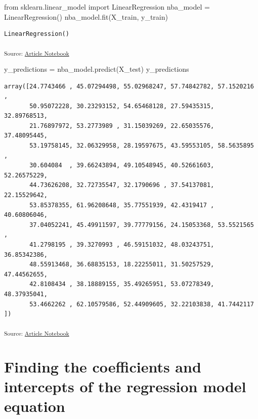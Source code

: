 \documentclass[
  a4paper,
  DIV=11,
  numbers=noendperiod]{scrreprt}
\newenvironment{Shaded}{\begin{snugshade}}{\end{snugshade}}
\newcommand{\ImportTok}[1]{\textcolor[rgb]{0.00,0.46,0.62}{#1}}
\newcommand{\NormalTok}[1]{\textcolor[rgb]{0.00,0.23,0.31}{#1}}
\newcommand{\OperatorTok}[1]{\textcolor[rgb]{0.37,0.37,0.37}{#1}}
\begin{document}
\begin{Shaded}
\begin{Highlighting}[]
\ImportTok{from}\NormalTok{ sklearn.linear\_model }\ImportTok{import}\NormalTok{ LinearRegression}
\NormalTok{nba\_model }\OperatorTok{=}\NormalTok{ LinearRegression()}
\NormalTok{nba\_model.fit(X\_train, y\_train)}
\end{Highlighting}
\end{Shaded}

\begin{verbatim}
LinearRegression()
\end{verbatim}

\textsubscript{Source:
\href{https://sigmadream.github.io/practice-quarto/NBA_2023-24.ipynb.html}{Article
Notebook}}

\begin{Shaded}
\begin{Highlighting}[]
\NormalTok{y\_predictions }\OperatorTok{=}\NormalTok{ nba\_model.predict(X\_test)}
\NormalTok{y\_predictions}
\end{Highlighting}
\end{Shaded}

\begin{verbatim}
array([24.7743466 , 45.07294498, 55.02968247, 57.74842782, 57.1520216 ,
       50.95072228, 30.23293152, 54.65468128, 27.59435315, 32.89768513,
       21.76897972, 53.2773989 , 31.15039269, 22.65035576, 37.48095445,
       53.19758145, 32.06329958, 28.19597675, 43.59553105, 58.5635895 ,
       30.604084  , 39.66243894, 49.10548945, 40.52661603, 52.26575229,
       44.73626208, 32.72735547, 32.1790696 , 37.54137081, 22.15529642,
       53.85378355, 61.96208648, 35.77551939, 42.4319417 , 40.60806046,
       37.04052241, 45.49911597, 39.77779156, 24.15053368, 53.5521565 ,
       41.2798195 , 39.3270993 , 46.59151032, 48.03243751, 36.85342386,
       48.55913468, 36.68835153, 18.22255011, 31.50257529, 47.44562655,
       42.8108434 , 38.18889155, 35.49265951, 53.07278349, 48.37935041,
       53.4662262 , 62.10579586, 52.44909605, 32.22103838, 41.7442117 ])
\end{verbatim}

\textsubscript{Source:
\href{https://sigmadream.github.io/practice-quarto/NBA_2023-24.ipynb.html}{Article
Notebook}}

\chapter{Finding the coefficients and intercepts of the regression model
equation}\label{finding-the-coefficients-and-intercepts-of-the-regression-model-equation}
\end{document}
